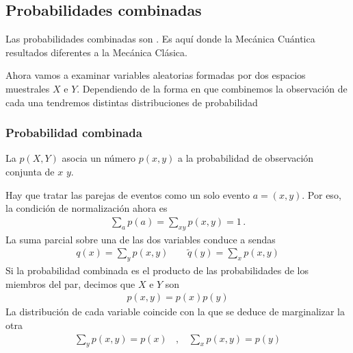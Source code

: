\documentclass[letterpaper,10pt,english]{jupyterBook}
\begin{document}
\subsection{Probabilidades combinadas}
\label{\detokenize{docs/Part_01_Formalismo/Chapter_01_02_Formalismo_matem_xe1tico/01_05_Probabilidades_myst:probabilidades-combinadas}}
\sphinxAtStartPar
Las probabilidades combinadas son . Es aquí donde la Mecánica Cuántica  resultados diferentes a la Mecánica Clásica.

\sphinxAtStartPar
Ahora vamos a examinar variables aleatorias formadas por dos espacios muestrales \(X\) e \(Y\). Dependiendo de la forma en que combinemos la observación de cada una tendremos distintas distribuciones de probabilidad


\subsubsection{Probabilidad combinada}
\label{\detokenize{docs/Part_01_Formalismo/Chapter_01_02_Formalismo_matem_xe1tico/01_05_Probabilidades_myst:probabilidad-combinada}}
\sphinxAtStartPar
La   \(p(X,Y)\) asocia un número \(p(x,y)\) a la probabilidad de observación conjunta de \(x\)  \(y\).

\sphinxAtStartPar
Hay que tratar las parejas de eventos  como un solo evento  \(a = (x,y)\). Por eso, la condición de normalización ahora es
\begin{equation*}
\begin{split}
\sum_a p(a) = \sum_{xy} p(x,y) = 1\, .
\end{split}
\end{equation*}
\sphinxAtStartPar
La suma parcial sobre una de las dos variables conduce a sendas 
\begin{equation*}
\begin{split}
q(x) = \sum_{y} p(x,y) ~~~~~~~~~ \tilde q(y) = \sum_{x} p(x,y)
\end{split}
\end{equation*}
\sphinxAtStartPar
Si la probabilidad combinada es el producto de las probabilidades de los miembros del par, decimos que \(X\) e \(Y\) son 
\begin{equation*}
\begin{split}
p(x,y) = p(x) p(y)
\end{split}
\end{equation*}
\sphinxAtStartPar
La distribución de cada variable coincide con la que se deduce de marginalizar la otra
\begin{equation*}
\begin{split}
\sum_y p(x,y) = p(x)~~~~,~~~~\sum_x p(x,y) = p(y)
\end{split}
\end{equation*}
\end{document}

